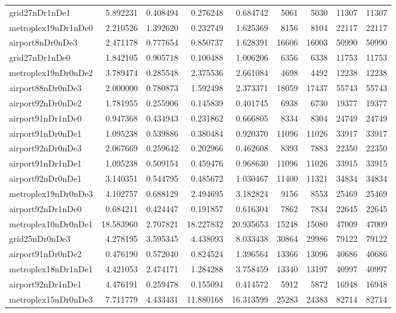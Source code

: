 \begin{longtable}{|l|r|r|r|r|r|r|r|r|}
grid27nDr1nDe1 & 5.892231 & 0.408494 & 0.276248 & 0.684742 & 5061 & 5030 & 11307 & 11307 \\
metroplex19nDr1nDe0 & 2.210526 & 1.392620 & 0.232749 & 1.625369 & 8156 & 8104 & 22117 & 22117 \\
airport8nDr0nDe3 & 2.471178 & 0.777654 & 0.850737 & 1.628391 & 16606 & 16003 & 50990 & 50990 \\
grid27nDr1nDe0 & 1.842105 & 0.905718 & 0.100488 & 1.006206 & 6356 & 6338 & 11753 & 11753 \\
metroplex19nDr0nDe2 & 3.789474 & 0.285548 & 2.375536 & 2.661084 & 4698 & 4492 & 12238 & 12238 \\
airport88nDr0nDe3 & 2.000000 & 0.780873 & 1.592498 & 2.373371 & 18059 & 17437 & 55743 & 55743 \\
airport92nDr0nDe2 & 1.781955 & 0.255906 & 0.145839 & 0.401745 & 6938 & 6730 & 19377 & 19377 \\
airport91nDr1nDe0 & 0.947368 & 0.434943 & 0.231862 & 0.666805 & 8334 & 8304 & 24749 & 24749 \\
airport91nDr0nDe1 & 1.095238 & 0.539886 & 0.380484 & 0.920370 & 11096 & 11026 & 33917 & 33917 \\
airport92nDr0nDe3 & 2.067669 & 0.259642 & 0.202966 & 0.462608 & 8393 & 7883 & 22350 & 22350 \\
airport91nDr1nDe1 & 1.095238 & 0.509154 & 0.459476 & 0.968630 & 11096 & 11026 & 33915 & 33915 \\
airport92nDr0nDe1 & 3.140351 & 0.544795 & 0.485672 & 1.030467 & 11400 & 11321 & 34834 & 34834 \\
metroplex19nDr0nDe3 & 4.102757 & 0.688129 & 2.494695 & 3.182824 & 9156 & 8553 & 25469 & 25469 \\
airport92nDr1nDe0 & 0.684211 & 0.424447 & 0.191857 & 0.616304 & 7862 & 7834 & 22645 & 22645 \\
metroplex10nDr0nDe1 & 18.583960 & 2.707821 & 18.227832 & 20.935653 & 15248 & 15080 & 47009 & 47009 \\
grid25nDr0nDe3 & 4.278195 & 3.595345 & 4.438093 & 8.033438 & 30864 & 29986 & 79122 & 79122 \\
airport91nDr0nDe2 & 0.476190 & 0.572040 & 0.824524 & 1.396564 & 13366 & 13096 & 40686 & 40686 \\
metroplex18nDr1nDe1 & 4.421053 & 2.474171 & 1.284288 & 3.758459 & 13340 & 13197 & 40997 & 40997 \\
airport92nDr1nDe1 & 4.476191 & 0.259478 & 0.155094 & 0.414572 & 5912 & 5872 & 16948 & 16948 \\
metroplex15nDr0nDe3 & 7.711779 & 4.433431 & 11.880168 & 16.313599 & 25283 & 24383 & 82714 & 82714 \\

\end{longtable}
